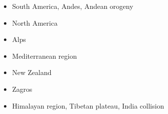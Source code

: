 \begin{itemize}
\item South America, Andes, Andean orogeny 
{\scriptsize
\cite{wdbo94b}
\cite{gusb00}
\cite{vavv02b}
\cite{baso05}\cite{soba05}
\cite{basv06}
\cite{hucf12}\cite{shlm12}
\cite{cudd15}
\cite{robn16}
\cite{sche17}
\cite{yamg19}
}
\item North America 
{\scriptsize
\cite{huha90}
\cite{bugm97}
\cite{besb06}
\cite{splg08}
\cite{splg09}
\cite{ghbh13}\cite{simi13}
\cite{riag15}
}
\item Alps 
{\scriptsize
\cite{beeh96}
\cite{repe97}
\cite{pfeb00}
\cite{pfsb02}
\cite{pimo03}
\cite{buge05}
\cite{vifj08}
\cite{luws13}
\cite{bubj14}
\cite{scdu15}
}
\item Mediterranean region 
{\scriptsize
\cite{pimo97}
\cite{pimo03}
\cite{bofb10}\cite{fabe10}
\cite{chsv14}\cite{chsg14}\cite{vavs14}
\cite{spcv18}
}
\item {New Zealand} 
{\scriptsize
\cite{koon90}
\cite{brbe95}
\cite{bekh96}
\cite{wabb98}
\cite{babr99}
\cite{gedh02}\cite{pybf02}
\cite{gehd03}\cite{konc03}\cite{upke03}
\cite{libi06}
\cite{pyeg10}\cite{spgs10a}
\cite{grel12}
\cite{sths13}
}
\item {Zagros} 
{\scriptsize
\cite{vech06}
\cite{hamo10}
\cite{yakm11}
\cite{nipc13}
\cite{frba14}
\cite{ghbu14}
\cite{coyc16}
\cite{rugb17}
}
\item {Himalayan region, Tibetan plateau, India collision} 


\end{itemize}
